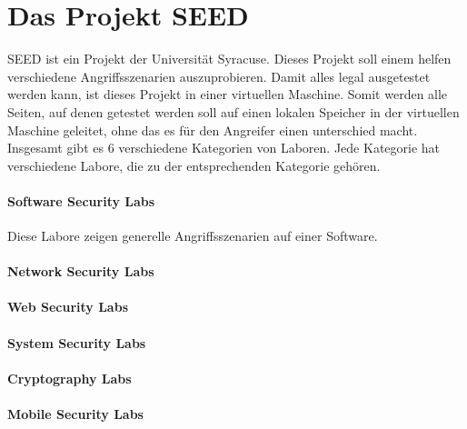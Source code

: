\chapter{Das Projekt SEED}
SEED ist ein Projekt der Universität Syracuse. Dieses Projekt soll einem helfen verschiedene Angriffsszenarien auszuprobieren. Damit alles legal ausgetestet werden kann, ist dieses Projekt in einer virtuellen Maschine. Somit werden alle Seiten, auf denen getestet werden soll auf einen lokalen Speicher in der virtuellen Maschine geleitet, ohne das es für den Angreifer einen unterschied macht. \\
Insgesamt gibt es 6 verschiedene Kategorien von Laboren. Jede Kategorie hat verschiedene Labore, die zu der entsprechenden Kategorie gehören.
\subsubsection{Software Security Labs}
Diese Labore zeigen generelle Angriffsszenarien auf einer Software. 
\subsubsection{Network Security Labs}
\subsubsection{Web Security Labs}
\subsubsection{System Security Labs}
\subsubsection{Cryptography Labs}
\subsubsection{Mobile Security Labs}
